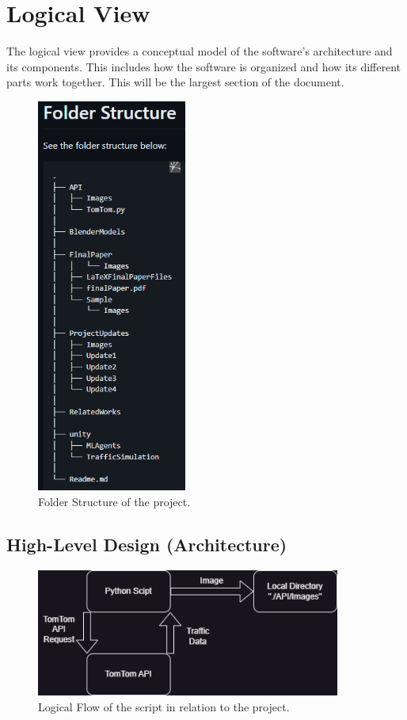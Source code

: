 \section{Logical View}

The logical view provides a conceptual model of the software's architecture and its components. 
This includes how the software is organized and how its different parts work together.
This will be the largest section of the document.

\begin{figure}[h]
    \centering
    \includegraphics[height=13cm]{Images/FolderStructure.png}
       \caption{Folder Structure of the project.}
           \label{Fig:ProjHier}
\end{figure}

\subsection{High-Level Design (Architecture)}

\begin{figure}[htb]
    \centering
    \includegraphics[width=10cm]{Images/TomTomLogFlow.png}
       \caption{Logical Flow of the script in relation to the project.}
           \label{Fig:TomTomLogFlow}
\end{figure}

